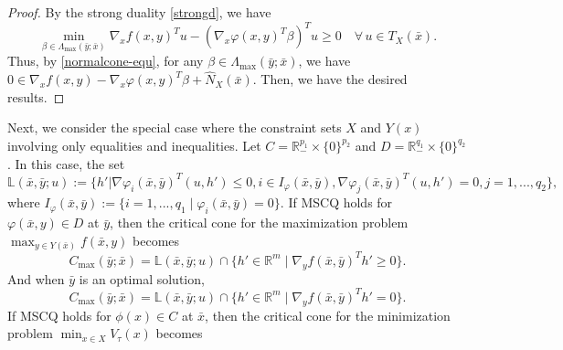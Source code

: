 \documentclass[11pt]{article}
\numberwithin{equation}{section}
\begin{document}
{\begin{proof}
By the strong duality \eqref{strongd}, we have 
$$\min\limits_{\beta \in \Lambda_{\max}(\bar y; \bar x)} \nabla_x f(x,y)^Tu - (\nabla_x \varphi(x,y)^T\beta) ^Tu \geq 0 \quad \forall\, u \in T_X(\bar{x}).$$
Thus, by \eqref{normalcone-equ}, for any $\beta \in \Lambda_{\max}(\bar y;\bar x)$, we have
$0 \in \nabla_x f(x,y) - \nabla_x \varphi(x,y)^T\beta + \widehat N_{X}(\bar x)$.
Then, we have the desired results.
\end{proof}


Next, we consider the special case where the constraint sets $X$ and $Y(x)$ involving only equalities and inequalities. Let $C=\mathbb{R}^{p_1}_- \times \{0\}^{p_2}$ and $D=\mathbb{R}^{q_1}_- \times \{0\}^{q_2}$. In this case,
the set
$$\mathbb{L}(\bar x,\bar y;u) :=\{h'|\nabla \varphi_i(\bar x,\bar y)^T (u,h') \leq 0, i \in I_{\varphi}(\bar x,\bar y), \nabla \varphi_j(\bar x,\bar y)^T (u,h') = 0, j=1,...,q_2\},$$
where  $I_\varphi(\bar x,\bar y):=\{i=1,...,q_1\mid\varphi_i(\bar x,\bar y)=0\}$.
If MSCQ holds for $\varphi(\bar x,y)\in D$ at $\bar y$, then the critical cone for the maximization problem $\max_{y\in Y(\bar x)} f(\bar x,y)$ becomes
 $$C_{\max}(\bar y;\bar x) = \mathbb{L}(\bar x,\bar y;u) 
	\cap \{ h' \in \mathbb{R}^m \mid \nabla_y f(\bar x,\bar y)^Th'\geq  0 \}.$$
	And when $\bar y$ is an optimal solution, 
	$$C_{\max}(\bar y;\bar x) = \mathbb{L}(\bar x,\bar y;u) 
	\cap \{ h' \in \mathbb{R}^m \mid \nabla_y f(\bar x,\bar y)^T h'=  0 \}.$$
If MSCQ holds for $\phi(x)\in C$ at $\bar x$, then the critical cone for the minimization problem $\min_{x\in X} V_{\tau}(x)$ becomes
}
\end{document}
